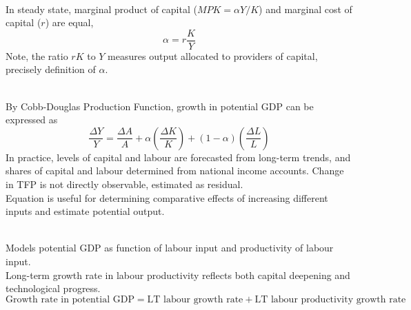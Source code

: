 \begin{remark} \\
In steady state, marginal product of capital ($MPK = \alpha Y/K$) and marginal cost of capital ($r$) are equal,
\begin{equation}
\alpha = r \frac{K}{Y} \nonumber
\end{equation}
Note, the ratio $rK$ to $Y$ measures output allocated to providers of capital, precisely definition of $\alpha$.
\end{remark}

\begin{definition} \\
By Cobb-Douglas Production Function, growth in potential GDP can be expressed as
\begin{equation}
\frac{\Delta Y}{Y} = \frac{\Delta A}{A} + \alpha \left( \frac{\Delta K}{K} \right) + (1 - \alpha)\left( \frac{\Delta L}{L} \right) \nonumber
\end{equation}
In practice, levels of capital and labour are forecasted from long-term trends, and shares of capital and labour determined from national income accounts. Change in TFP is not directly observable, estimated as residual.\\
Equation is useful for determining comparative effects of increasing different inputs and estimate potential output.
\end{definition}

\begin{definition} \\
Models potential GDP as function of labour input and productivity of labour input.\\
Long-term growth rate in labour productivity reflects both capital deepening and technological progress.
\begin{equation}
\text{Growth rate in potential GDP} = \text{LT labour growth rate} + \text{LT labour productivity growth rate} \nonumber
\end{equation}
\end{definition}

